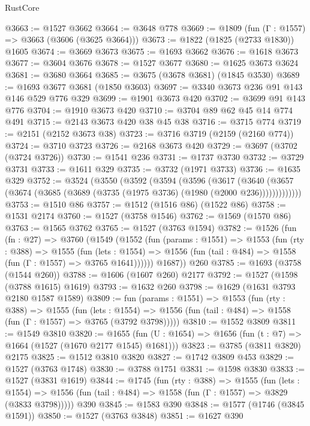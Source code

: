 \begin{lexlean}{RustCore}
\begin{coremodule}
@3663 := @1527 @3662
@3664 := @3648 @778
@3669 := @1809 (fun (Γ : @1557) => @3663 (@3606 (@3625 @3664)))
@3673 := @1822 (@1825 (@2733 @1830)) @1605
@3674 := @3669 @3673
@3675 := @1693 @3662
@3676 := @1618 @3673
@3677 := @3604 @3676
@3678 := @1527 @3677
@3680 := @1625 @3673 @3624
@3681 := @3680 @3664
@3685 := @3675 (@3678 @3681) (@1845 @3530)
@3689 := @1693 @3677 @3681 (@1850 @3603)
@3697 := @3340 @3673 @236 @91 @143 @146 @529 @776 @329
@3699 := @1901 @3673 @420
@3702 := @3699 @91 @143 @776
@3704 := @1910 @3673 @420
@3710 := @3704 @89 @62 @45 @14 @774 @491
@3715 := @2143 @3673 @420 @38 @45 @38
@3716 := @3715 @774
@3719 := @2151 (@2152 @3673 @38)
@3723 := @3716 @3719 (@2159 (@2160 @774))
@3724 := @3710 @3723
@3726 := @2168 @3673 @420
@3729 := @3697 (@3702 (@3724 @3726))
@3730 := @1541 @236
@3731 := @1737 @3730
@3732 := @3729 @3731
@3733 := @1611 @329
@3735 := @3732 (@1971 @3733)
@3736 := @1635 @329
@3752 := @3524
    (@3550
      (@3592
        (@3594
          (@3596
            (@3617
              (@3640
                (@3657 (@3674 (@3685 (@3689 (@3735 (@1975 @3736) (@1980 (@2000 @236)))))))))))))
@3753 := @1510 @86
@3757 := @1512 (@1516 @86) (@1522 @86)
@3758 := @1531 @2174
@3760 := @1527 (@3758 @1546)
@3762 := @1569 (@1570 @86)
@3763 := @1565 @3762
@3765 := @1527 (@3763 @1594)
@3782 := @1526
    (fun (fn : @27) =>
    @3760
      (@1549
        (@1552
          (fun (params : @1551) =>
          @1553
            (fun (rty : @388) =>
            @1555
              (fun (lets : @1554) =>
              @1556 (fun (tail : @484) => @1558 (fun (Γ : @1557) => @3765 @1641))))))
        @1687))
    @260
@3785 := @1693 (@3758 (@1544 @260))
@3788 := @1606 (@1607 @260) @2177
@3792 := @1527 (@1598 (@3788 @1615) @1619)
@3793 := @1632 @260
@3798 := @1629 (@1631 @3793 @2180 @1587 @1589)
@3809 := fun (params : @1551) =>
  @1553
    (fun (rty : @388) =>
    @1555
      (fun (lets : @1554) =>
      @1556 (fun (tail : @484) => @1558 (fun (Γ : @1557) => @3765 (@3792 @3798)))))
@3810 := @1552 @3809
@3811 := @1549 @3810
@3820 := @1655 (fun (U : @1654) => @1656 (fun (t : @7) => @1664 (@1527 (@1670 @2177 @1545) @1681)))
@3823 := @3785 (@3811 @3820) @2175
@3825 := @1512 @3810 @3820
@3827 := @1742 @3809 @453
@3829 := @1527 (@3763 @1748)
@3830 := @3788 @1751
@3831 := @1598 @3830
@3833 := @1527 (@3831 @1619)
@3844 := @1745
    (fun (rty : @388) =>
    @1555
      (fun (lets : @1554) =>
      @1556 (fun (tail : @484) => @1558 (fun (Γ : @1557) => @3829 (@3833 @3798)))))
    @390
@3845 := @1583 @390
@3848 := @1577 (@1746 (@3845 @1591))
@3850 := @1527 (@3763 @3848)
@3851 := @1627 @390

\end{coremodule}
\end{lexlean}
